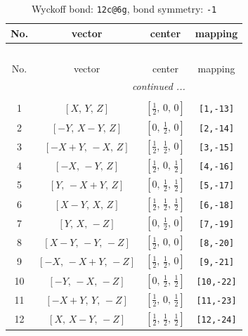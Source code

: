 \documentclass[fleqn,8pt]{jsarticle}
\begin{document}
\begin{longtable}{cccc}
\caption{Wyckoff bond: {\tt 12c@6g}, bond symmetry: {\tt -1}}
 \\
 \hline \hline
No. & vector & center & mapping \\ \hline \endfirsthead

\multicolumn{3}{l}{\tablename\ \thetable{}} \\
 \hline \hline
No. & vector & center & mapping \\ \hline \endhead

 \hline \hline
\multicolumn{3}{r}{\footnotesize\it continued ...} \\ \endfoot

 \hline \hline
\multicolumn{3}{r}{} \\ \endlastfoot

1 & $\left[ X,\, Y,\, Z \right]$ & $\left[ \frac{1}{2},\, 0,\, 0 \right]$ & {\tt [1,-13]} \\ \hline
2 & $\left[ - Y,\, X - Y,\, Z \right]$ & $\left[ 0,\, \frac{1}{2},\, 0 \right]$ & {\tt [2,-14]} \\ \hline
3 & $\left[ - X + Y,\, - X,\, Z \right]$ & $\left[ \frac{1}{2},\, \frac{1}{2},\, 0 \right]$ & {\tt [3,-15]} \\ \hline
4 & $\left[ - X,\, - Y,\, Z \right]$ & $\left[ \frac{1}{2},\, 0,\, \frac{1}{2} \right]$ & {\tt [4,-16]} \\ \hline
5 & $\left[ Y,\, - X + Y,\, Z \right]$ & $\left[ 0,\, \frac{1}{2},\, \frac{1}{2} \right]$ & {\tt [5,-17]} \\ \hline
6 & $\left[ X - Y,\, X,\, Z \right]$ & $\left[ \frac{1}{2},\, \frac{1}{2},\, \frac{1}{2} \right]$ & {\tt [6,-18]} \\ \hline
7 & $\left[ Y,\, X,\, - Z \right]$ & $\left[ 0,\, \frac{1}{2},\, 0 \right]$ & {\tt [7,-19]} \\ \hline
8 & $\left[ X - Y,\, - Y,\, - Z \right]$ & $\left[ \frac{1}{2},\, 0,\, 0 \right]$ & {\tt [8,-20]} \\ \hline
9 & $\left[ - X,\, - X + Y,\, - Z \right]$ & $\left[ \frac{1}{2},\, \frac{1}{2},\, 0 \right]$ & {\tt [9,-21]} \\ \hline
10 & $\left[ - Y,\, - X,\, - Z \right]$ & $\left[ 0,\, \frac{1}{2},\, \frac{1}{2} \right]$ & {\tt [10,-22]} \\ \hline
11 & $\left[ - X + Y,\, Y,\, - Z \right]$ & $\left[ \frac{1}{2},\, 0,\, \frac{1}{2} \right]$ & {\tt [11,-23]} \\ \hline
12 & $\left[ X,\, X - Y,\, - Z \right]$ & $\left[ \frac{1}{2},\, \frac{1}{2},\, \frac{1}{2} \right]$ & {\tt [12,-24]} \\
\end{longtable}
\end{document}
